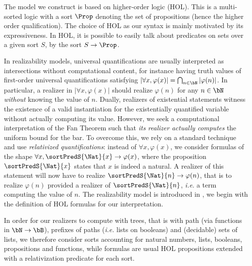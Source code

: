 
The model we construct is based on higher-order logic (HOL). This is a multi-sorted logic with a sort $\Prop$ denoting the set of propositions (hence the higher order qualification).
The choice of HOL as our syntax is mainly motivated by its expressiveness. In HOL, it is possible to easily talk about predicates on sets over a given sort $S$, by the sort $S \to \Prop$. %


In realizability models, universal quantifications are usually interpreted as intersections without computational content, for instance having truth values of first-order universal quantifications satisfying $|\forall x,\varphi(x)|=\bigcap_{n\in\bN}|\varphi(n)|$. In particular, a realizer in $|\forall x,\varphi(x)|$ should realize $\varphi(n)$ for any $n\in\bN$ \emph{without} knowing the value of $n$. Dually, realizers of existential statements witness the existence of a valid instantiation for the existentially quantified variable without actually computing its value.
However, we seek a computational interpretation of the Fan Theorem such that \emph{its realizer actually computes} the uniform bound for the bar.
To overcome this, we rely on a standard technique and use \emph{relativized quantifications}: instead of $\forall x,\varphi(x)$, we consider
formulas of the shape $\forall x,\sortPredS{\Nat}{x} \to \varphi(x)$, where the proposition $\sortPredS{\Nat}{x}$ states that $x$ is indeed a natural. A realizer of this statement will now have to realize  $\sortPredS{\Nat}{n}\to \varphi(n)$, that is to realize $\varphi(n)$ provided a realizer of $\sortPredS{\Nat}{n}$, \emph{i.e.} a term computing the value of $n$. The realizability model is introduced in , we begin with the definition of HOL formulas for our interpretation.

In order for our realizers to compute with trees, that is with path (via functions in $\bN\to\bB$), prefixes of paths (\emph{i.e.} lists on booleans) and (decidable) sets of lists, we therefore consider sorts accounting for natural numbers, lists, booleans, propositions and functions, while formulas are usual HOL propositions extended with a relativization predicate for each sort.


